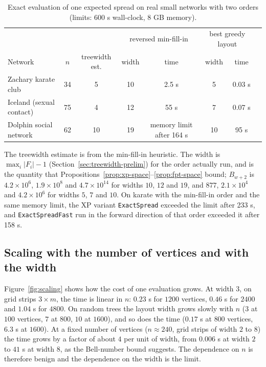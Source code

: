 \documentclass[11pt]{article}
\theoremstyle{definition}
\theoremstyle{remark}
\newcommand{\up}{\rule{0pt}{2.6ex}}
\newcommand{\down}{\rule[-1.2ex]{0pt}{0pt}}
\begin{document}
\begin{table}[h]
\centering
\caption{Exact evaluation of one expected spread on real small networks with two orders (limits: 600 s wall-clock, 8 GB memory).\label{tab:twig-feasibility}}
\small
\begin{tabular}{@{}lccccccc@{}}
\hline
\up & & & \multicolumn{2}{c}{reversed min-fill-in} & \multicolumn{2}{c}{best greedy layout} \\
Network & $n$ & treewidth est. & width & time & width & time \\
\hline
\up Zachary karate club & 34 & 5 & 10 & 2.5 s & 5 & 0.03 s \\
Iceland (sexual contact) & 75 & 4 & 12 & 55 s & 7 & 0.07 s \\
\down Dolphin social network & 62 & 10 & 19 & memory limit after 164 s & 10 & 95 s \\
\hline
\end{tabular}

\smallskip
\begin{minipage}{0.94\linewidth}
\footnotesize The treewidth estimate is from the min-fill-in heuristic. The width is $\max_i|F_i|-1$ (Section~\ref{sec:treewidth-prelim}) for the order actually run, and is the quantity that Propositions~\ref{prop:xp-space}--\ref{prop:fpt-space} bound; $B_{w+2}$ is $4.2\times10^{6}$, $1.9\times10^{8}$ and $4.7\times10^{14}$ for widths $10$, $12$ and $19$, and $877$, $2.1\times10^{4}$ and $4.2\times10^{6}$ for widths $5$, $7$ and $10$. On karate with the min-fill-in order and the same memory limit, the XP variant \texttt{ExactSpread} exceeded the limit after 233 s, and \texttt{ExactSpreadFast} run in the forward direction of that order exceeded it after 158 s.
\end{minipage}
\end{table}

\subsection{Scaling with the number of vertices and with the width}\label{sec:exp-scaling}

Figure~\ref{fig:scaling} shows how the cost of one evaluation grows. At width $3$, on grid strips $3\times m$, the time is linear in $n$: $0.23$ s for $1200$ vertices, $0.46$ s for $2400$ and $1.04$ s for $4800$. On random trees the layout width grows slowly with $n$ ($3$ at $100$ vertices, $7$ at $800$, $10$ at $1600$), and so does the time ($0.17$ s at $800$ vertices, $6.3$ s at $1600$). At a fixed number of vertices ($n\approx240$, grid strips of width $2$ to $8$) the time grows by a factor of about $4$ per unit of width, from $0.006$ s at width $2$ to $41$ s at width $8$, as the Bell-number bound suggests. The dependence on $n$ is therefore benign and the dependence on the width is the limit.
\end{document}
